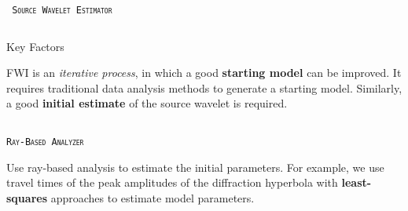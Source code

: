 \documentclass[final]{beamer}
\newlength{\onecolwid}
\newlength{\twocolwid}
\begin{document}
\begin{frame}[t]
\begin{columns}[t]
\begin{column}{\twocolwid}
\begin{columns}[t,totalwidth=\twocolwid]
\begin{column}{\onecolwid}
\begin{block}{\textsc{\texttt{ Source Wavelet Estimator}}}
\end{block}


\end{column} %

\end{columns} %

\vspace{-1cm}
\begin{alertblock}{Key Factors}

FWI is an \textit{iterative process}, in which a good \textbf{starting model} can be improved. It requires traditional data analysis methods to generate a starting model. Similarly, a good \textbf{initial estimate} of the source wavelet is required.

\end{alertblock} 


\begin{columns}[t,totalwidth=\twocolwid] %

\begin{column}{\onecolwid} %


\begin{block}{\textsc{\texttt{Ray-Based Analyzer}}}

Use ray-based analysis to estimate the initial parameters. For example, we use travel times of the peak amplitudes of the diffraction hyperbola with \textbf{least-squares} approaches to estimate model parameters.  


\end{block}
\end{column}
\end{columns}
\end{column}
\end{columns}
\end{frame}
\end{document}
